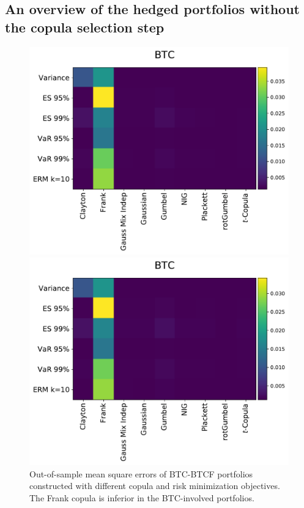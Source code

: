 \subsection{An overview of the hedged portfolios without the copula
  selection step}
\label{subsec:HP1}
  \begin{figure}[t]
    \centering
    \begin{minipage}[t]{.475\textwidth}
        \centering
        \includegraphics[width=\textwidth]{_pics/MSE_BTC.pdf}
      \caption{Out-of-sample mean square errors of BTC-BTCF portfolios constructed with different copula and risk minimization objectives.
        The Frank copula is inferior in the BTC-involved portfolios.}
    \label{fig:MSE_BTC}
    \end{minipage}
    \hfill
    \begin{minipage}[t]{.475\textwidth}
        \centering
        \includegraphics[width=\textwidth]{_pics/semiLowerVariance_BTC.pdf}

\end{minipage}
\end{figure}
